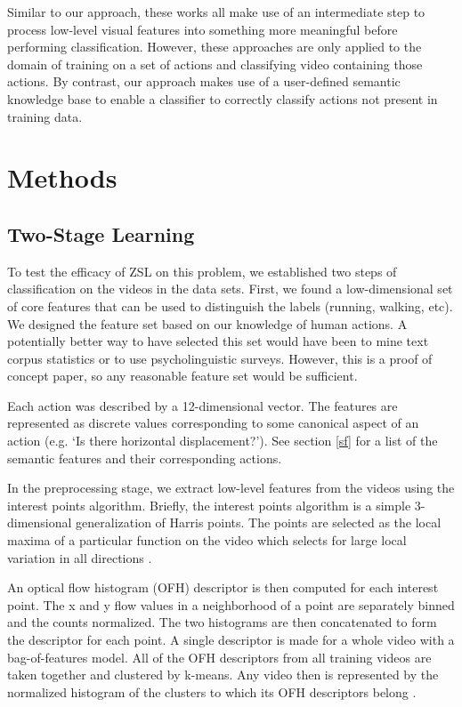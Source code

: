 \documentclass{article}
\begin{document}
Similar to our approach, these works all make use of an intermediate step to process low-level visual features into something more meaningful before performing classification. However, these approaches are only applied to the domain of training on a set of actions and classifying video containing those actions. By contrast, our approach makes use of a user-defined semantic knowledge base to enable a classifier to correctly classify actions not present in training data.

\section{Methods}

\subsection{Two-Stage Learning}
To test the efficacy of ZSL on this problem, we established two steps of classification on the videos in the data sets. First, we found a low-dimensional set of core features that can be used to distinguish the labels (running, walking, etc).  We designed the feature set based on our knowledge of human actions. A potentially better way to have selected this set would have been to mine text corpus statistics or to use psycholinguistic surveys. However, this is a proof of concept paper, so any reasonable feature set would be sufficient. 

Each action was described by a 12-dimensional vector. The features are represented as discrete values corresponding to some canonical aspect of an action (e.g. `Is there horizontal displacement?'). See section \ref{sf} for a list of the semantic features and their corresponding actions.

In the preprocessing stage, we extract low-level features from the videos using the interest points algorithm. Briefly, the interest points algorithm is a simple 3-dimensional generalization of Harris points. The points are selected as the local maxima of a particular function on the video which selects for large local variation in all directions \cite{Laptev05}.

An optical flow histogram (OFH) descriptor is then computed for each interest point. The x and y flow values in a neighborhood of a point are separately binned and the counts normalized. The two histograms are then concatenated to form the descriptor for each point. A single descriptor is made for a whole video with a bag-of-features model. All of the OFH descriptors from all training videos are taken together and clustered by k-means. Any video then is represented by the normalized histogram of the clusters to which its OFH descriptors belong \cite{Laptev04}.
\end{document}
